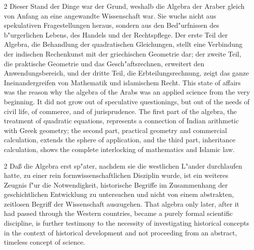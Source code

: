 \documentclass[10pt,a4paper]{article}
\renewcommand{\switchcolumn}{\syncronize\nointerlineskip\columnbreak}
\begin{document}
\begin{paracol}{2}
Dieser Stand der Dinge war der Grund, weshalb die Algebra der Araber gleich von Anfang an eine angewandte Wissenschaft war. Sie wuchs nicht aus spekulativen Fragestellungen heraus, sondern aus den Bed"urfnissen des b"urgerlichen Lebens, des Handels und der Rechtspflege. Der erste Teil der Algebra, die Behandlung der quadratischen Gleichungen, stellt eine Verbindung der indischen Rechenkunst mit der griechischen Geometrie dar; der zweite Teil, die praktische Geometrie und das Gesch"aftsrechnen, erweitert den Anwendungsbereich, und der dritte Teil, die Erbteilungsrechnung, zeigt das ganze Ineinandergreifen von Mathematik und islamischem Recht.
\switchcolumn
This state of affairs was the reason why the algebra of the Arabs was an applied science from the very beginning. It did not grow out of speculative questionings, but out of the needs of civil life, of commerce, and of jurisprudence. The first part of the algebra, the treatment of quadratic equations, represents a connection of Indian arithmetic with Greek geometry; the second part, practical geometry and commercial calculation, extends the sphere of application, and the third part, inheritance calculation, shows the complete interlocking of mathematics and Islamic law.
\end{paracol}

\begin{paracol}{2}
Da\ss{} die Algebra erst sp"ater, nachdem sie die westlichen L"ander durchlaufen hatte, zu einer rein formwissenschaftlichen Disziplin wurde, ist ein weiteres Zeugnis f"ur die Notwendigkeit, historische Begriffe im Zusammenhang der geschichtlichen Entwicklung zu untersuchen und nicht von einem abstrakten, zeitlosen Begriff der Wissenschaft auszugehen.
\switchcolumn
That algebra only later, after it had passed through the Western countries, became a purely formal scientific discipline, is further testimony to the necessity of investigating historical concepts in the context of historical development and not proceeding from an abstract, timeless concept of science.
\end{paracol}
\end{document}
